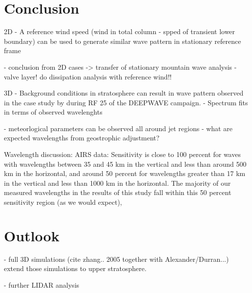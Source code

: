 \chapter{Conclusion}


2D
- A reference wind speed (wind in total column - spped of transient lower boundary) can be used to generate similar wave pattern in stationary reference frame

- conclusion from 2D cases -> transfer of stationary mountain wave analysis
- valve layer! do dissipation analysis with reference wind!!

3D
- Background conditions in stratosphere can result in wave pattern observed in the case study by \cite{dornbrack_stratospheric_2021} during RF 25 of the DEEPWAVE campaign.
- Spectrum fits in terms of observed wavelenghts

- meteorlogical parameters can be observed all around jet regions 
 - what are expected wavelengths from geostrophic adjustment?

Wavelength discussion:
AIRS data:
Sensitivity is close to 100 percent for waves with wavelengths between 35 and 45 km in the vertical and less than around 500 km in the horizontal, and around 50 percent for wavelengths greater than 17 km in the vertical and less than 1000 km in the horizontal. The majority of our measured wavelengths in the results of this study fall within this 50 percent sensitivity region (as we would expect),




\chapter{Outlook}

- full 3D simulations (cite zhang.. 2005 together with Alexander/Durran...) extend those simulations to upper stratosphere.

- further LIDAR analysis